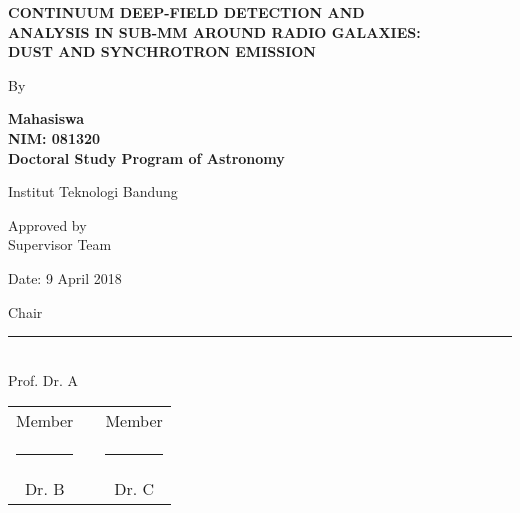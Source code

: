 \begin{center}
{\normalsize \textbf{CONTINUUM DEEP-FIELD DETECTION AND \\ ANALYSIS IN SUB-MM AROUND RADIO GALAXIES: \\ DUST AND SYNCHROTRON EMISSION}\par}
\vskip 1.2cm

{\normalsize By}\\
{\normalsize \textbf{Mahasiswa\\
NIM: 081320\\
Doctoral Study Program of Astronomy}\par}


{\normalsize Institut Teknologi Bandung} \\

\vskip 2cm

Approved by \\
Supervisor Team \par

\vskip 0.5cm

Date: 9 April 2018 \par

\vskip 1.0cm

Chair\par

\vskip 2.0cm

\rule{4.5cm}{0.4pt}\\[.5ex]
Prof. Dr. A

\vskip1.0cm

\begin{tabular}{ccc} %
Member &\hspace{4cm} & Member\\
\rule{4.5cm}{0.4pt} &\hspace{4cm} & \rule{4.5cm}{0.4pt}\\[.5ex]
Dr. B &\hspace{4cm} &  Dr. C 
\end{tabular} 



\end{center}


\cleardoublepage

